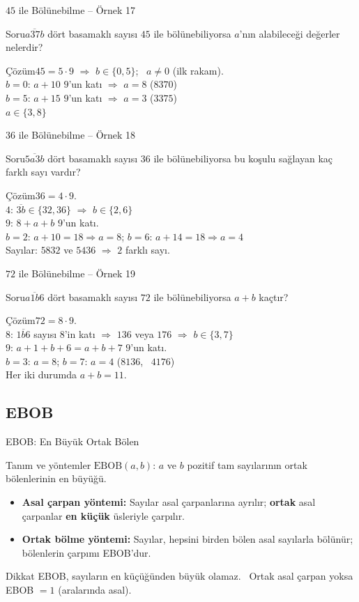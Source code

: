 \documentclass[aspectratio=169,11pt]{beamer}
\newcommand{\soru}[3]{%
\begin{frame}{#1}
  \begin{block}{Soru}\large #2\end{block}
  \pause
  \begin{exampleblock}{Çözüm}\large #3\end{exampleblock}
\end{frame}}
\newcommand{\ab}[1]{\overline{#1}}
\begin{document}
\soru{\(45\) ile Bölünebilme -- Örnek 17}
{\(\ab{a37b}\) dört basamaklı sayısı \(45\) ile bölünebiliyorsa \(a\)'nın alabileceği değerler nelerdir?}
{\(45=5\cdot 9\) \(\Rightarrow\) \(b\in\{0,5\}\); \ \(a\neq 0\) (ilk rakam).\\[3pt]
\(b=0\): \(a+10\) \(9\)'un katı \(\Rightarrow\) \(a=8\) \quad (\(8370\))\\[3pt]
\(b=5\): \(a+15\) \(9\)'un katı \(\Rightarrow\) \(a=3\) \quad (\(3375\))\\[3pt]
\(a\in\{3,8\}\)}

\soru{\(36\) ile Bölünebilme -- Örnek 18}
{\(\ab{5a3b}\) dört basamaklı sayısı \(36\) ile bölünebiliyorsa bu koşulu sağlayan kaç farklı sayı vardır?}
{\(36=4\cdot 9\).\\[3pt]
\(4\): \(\ab{3b}\in\{32,36\}\) \(\Rightarrow\) \(b\in\{2,6\}\)\\[3pt]
\(9\): \(8+a+b\) \(9\)'un katı.\\
\(b=2\): \(a+10=18\Rightarrow a=8\); \quad \(b=6\): \(a+14=18\Rightarrow a=4\)\\[3pt]
Sayılar: \(5832\) ve \(5436\) \(\Rightarrow\) \(2\) farklı sayı.}

\soru{\(72\) ile Bölünebilme -- Örnek 19}
{\(\ab{a1b6}\) dört basamaklı sayısı \(72\) ile bölünebiliyorsa \(a+b\) kaçtır?}
{\(72=8\cdot 9\).\\[3pt]
\(8\): \(\ab{1b6}\) sayısı \(8\)'in katı \(\Rightarrow\) \(136\) veya \(176\) \(\Rightarrow\) \(b\in\{3,7\}\)\\[3pt]
\(9\): \(a+1+b+6=a+b+7\) \(9\)'un katı.\\
\(b=3\): \(a=8\); \quad \(b=7\): \(a=4\) \quad (\(8136\), \ \(4176\))\\[3pt]
Her iki durumda \(a+b=11\).}

\subsection{EBOB}
\begin{frame}{EBOB: En Büyük Ortak Bölen}
\begin{block}{Tanım ve yöntemler}
\(\text{EBOB}(a,b)\): \(a\) ve \(b\) pozitif tam sayılarının ortak bölenlerinin en büyüğü.
\begin{itemize}
\item \textbf{Asal çarpan yöntemi:} Sayılar asal çarpanlarına ayrılır; \textbf{ortak} asal çarpanlar \textbf{en küçük} üsleriyle çarpılır.
\item \textbf{Ortak bölme yöntemi:} Sayılar, hepsini birden bölen asal sayılarla bölünür; bölenlerin çarpımı EBOB'dur.
\end{itemize}
\end{block}
\begin{alertblock}{Dikkat}
EBOB, sayıların en küçüğünden büyük olamaz. \ Ortak asal çarpan yoksa EBOB \(=1\) (aralarında asal).
\end{alertblock}
\end{frame}
\end{document}
